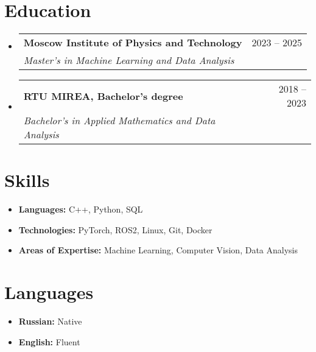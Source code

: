 \documentclass[letterpaper,11pt]{article}
\makeatletter
\newcommand{\resumeSubheading}[4]{
    \vspace{-2pt}
    \item
    \begin{tabular*}{0.97\textwidth}[t]{l@{\extracolsep{\fill}}r}
        \textbf{#1} & #2 \\
        \textit{\small #3} & \textit{\small #4} \\
    \end{tabular*}
    \vspace{-6pt}
}
\newcommand{\resumeSubHeadingListStart}{\begin{itemize}[leftmargin=0.15in, label={}]}
\newcommand{\resumeSubHeadingListEnd}{\end{itemize}}
\makeatother
\begin{document}
\section{Education}
\resumeSubHeadingListStart
    \resumeSubheading
        {Moscow Institute of Physics and Technology}{2023 -- 2025}
        {Master's in Machine Learning and Data Analysis}{}

    \resumeSubheading
        {RTU MIREA, Bachelor's degree}{2018 -- 2023}
        {Bachelor's in Applied Mathematics and Data Analysis}{}
\resumeSubHeadingListEnd

\section{Skills}
\begin{itemize}[leftmargin=0.15in, label={}]
    \item{\textbf{Languages:} C++, Python, SQL}
    \item{\textbf{Technologies:} PyTorch, ROS2, Linux, Git, Docker}
    \item{\textbf{Areas of Expertise:} Machine Learning, Computer Vision, Data Analysis}
\end{itemize}

\section{Languages}
\begin{itemize}[leftmargin=0.15in, label={}]
    \item{\textbf{Russian:} Native}
    \item{\textbf{English:} Fluent}
\end{itemize}
\end{document}
